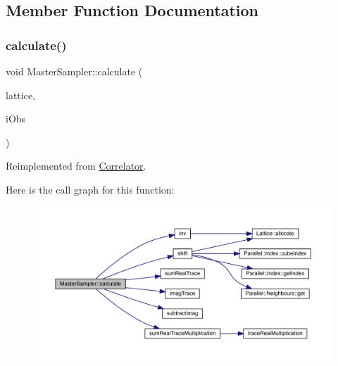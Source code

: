 \subsection{Member Function Documentation}
\mbox{\label{class_master_sampler_ad3cc7e36498dbf4a39238de3ac59ae8b}} 
\subsubsection{\texorpdfstring{calculate()}{calculate()}}
{\footnotesize\ttfamily void Master\+Sampler\+::calculate (\begin{DoxyParamCaption}\item[{\mbox{\hyperlink{class_lattice}{Lattice}}$<$ \mbox{\hyperlink{class_s_u3}{S\+U3}} $>$ $\ast$}]{lattice,  }\item[{unsigned int}]{i\+Obs }\end{DoxyParamCaption})\hspace{0.3cm}{\ttfamily [virtual]}}



Reimplemented from \mbox{\hyperlink{class_correlator_ab33502ff305f891c5c2e6d66a26a0247}{Correlator}}.

Here is the call graph for this function\+:\nopagebreak
\begin{figure}[H]
\begin{center}
\leavevmode
\includegraphics[width=350pt]{class_master_sampler_ad3cc7e36498dbf4a39238de3ac59ae8b_cgraph}
\end{center}
\end{figure}
\mbox{\label{class_master_sampler_a893be9ba7dca98cb8d9d3cb30e42fcc3}} 

